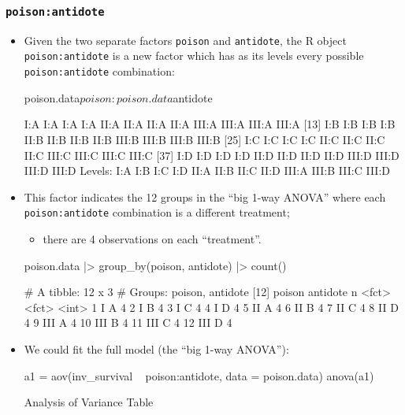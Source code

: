 \documentclass[a4paper]{article}
\begin{document}
\subsubsection{\textcolor{myblue}{\lstinline|poison:antidote|}}
\begin{itemize}
	\item Given the two separate factors \lstinline|poison| and \lstinline|antidote|, the R object \lstinline|poison:antidote| is a new factor which has as its levels every possible \lstinline|poison:antidote| combination:
\begin{Schunk}
\begin{Sinput}
poison.data$poison:poison.data$antidote
\end{Sinput}
\begin{Soutput}
 [1] I:A   I:A   I:A   I:A   II:A  II:A  II:A  II:A  III:A III:A III:A III:A
[13] I:B   I:B   I:B   I:B   II:B  II:B  II:B  II:B  III:B III:B III:B III:B
[25] I:C   I:C   I:C   I:C   II:C  II:C  II:C  II:C  III:C III:C III:C III:C
[37] I:D   I:D   I:D   I:D   II:D  II:D  II:D  II:D  III:D III:D III:D III:D
Levels: I:A I:B I:C I:D II:A II:B II:C II:D III:A III:B III:C III:D
\end{Soutput}
\end{Schunk}
	\item This factor indicates the 12 groups in the ``big 1-way ANOVA'' where each \lstinline|poison:antidote| combination is a different treatment;
	\begin{itemize}
		\item there are 4 observations on each ``treatment''.
	\end{itemize}
\begin{Schunk}
\begin{Sinput}
poison.data |> 
  group_by(poison, antidote) |> 
  count()
\end{Sinput}
\begin{Soutput}
# A tibble: 12 x 3
# Groups:   poison, antidote [12]
   poison antidote     n
   <fct>  <fct>    <int>
 1 I      A            4
 2 I      B            4
 3 I      C            4
 4 I      D            4
 5 II     A            4
 6 II     B            4
 7 II     C            4
 8 II     D            4
 9 III    A            4
10 III    B            4
11 III    C            4
12 III    D            4
\end{Soutput}
\end{Schunk}
	\item We could fit the full model (the ``big 1-way ANOVA''):
\begin{Schunk}
\begin{Sinput}
a1 = aov(inv_survival ~ poison:antidote, data = poison.data)
anova(a1)
\end{Sinput}
\begin{Soutput}
Analysis of Variance Table


\end{Soutput}
\end{Schunk}
\end{itemize}
\end{document}
